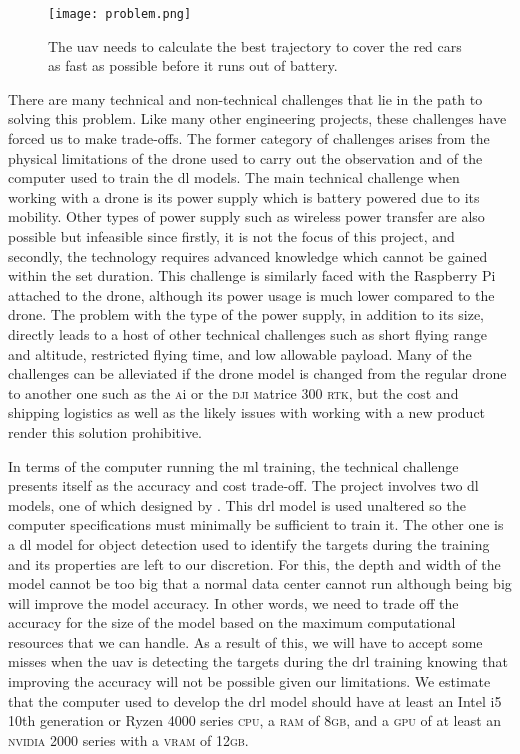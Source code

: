 \documentclass[../main.tex]{subfiles}
\begin{document}
\begin{figure}[tb] 
    \centering
    \texttt{[image: problem.png]} 
    \caption{The \gls{uav} needs to calculate 
    the best trajectory to cover the red cars
    as fast as possible before it runs out of battery.} 
    \label{fig:problem} 
\end{figure}

There are many technical and non-technical challenges
that lie in the path to solving this problem.
Like many other engineering projects,
these challenges have forced us to make trade-offs.
The former category of challenges arises 
from the physical limitations of the drone used to
carry out the observation
and of the computer used to train the \gls{dl} models.
The main technical challenge when working with a drone
is its power supply which is battery powered due to its mobility. 
Other types of power supply such as wireless power transfer
are also possible but infeasible since firstly, it is not the
focus of this project, and secondly, the technology requires 
advanced knowledge which cannot be gained within the set duration.
This challenge is similarly faced with the Raspberry Pi attached
to the drone, although its power usage 
is much lower compared to the drone.
The problem with the type of the power supply, in addition to its size, 
directly leads to a host of other technical challenges
such as short flying range and altitude, restricted flying time,
and low allowable payload.
Many of the challenges can be alleviated if the drone model is changed
from the regular \anafi drone to another one such as 
the \anafi \textsc{a}i or the \textsc{dji} 
\textsc{m}atrice 300 \textsc{rtk},
but the cost and shipping logistics as well as
the likely issues with working with a new product
render this solution prohibitive.

In terms of the computer running the \gls{ml} training,
the technical challenge presents itself as 
the accuracy and cost trade-off.
The project involves two \gls{dl} models,
one of which designed by \textcite{Ged21}.
This \gls{drl} model is used unaltered so 
the computer specifications must minimally be sufficient 
to train it.
The other one is a \gls{dl} model for object detection
used to identify the targets during the training
and its properties are left to our discretion.
For this, 
the depth and width of the model cannot be too big that
a normal data center cannot run although 
being big will improve
the model accuracy. In other words, we need to trade off
the accuracy for the size of the model 
based on the maximum computational resources that we can handle. 
As a result of this, we will have to accept some misses
when the \gls{uav} is detecting the targets during the 
\gls{drl} training knowing that improving the accuracy 
will not be possible given our limitations.
We estimate that the computer used to develop the \gls{drl} model
should have at least an Intel i5 10th generation or
Ryzen 4000 series \textsc{cpu}, a \textsc{ram} of 8\textsc{gb}, 
and a \textsc{gpu} of at least an \textsc{nvidia} 2000 series
with a \textsc{vram} of 12\textsc{gb}.
\end{document}
